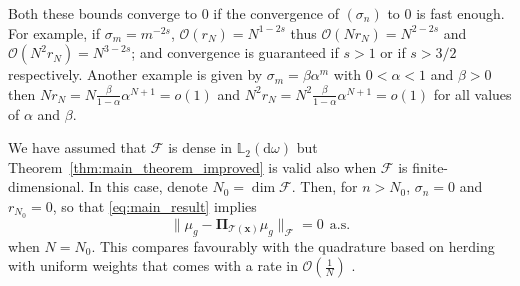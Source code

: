 \documentclass[twoside,11pt]{book}
\numberwithin{theorem}{chapter}
\numberwithin{definition}{chapter}
\numberwithin{proposition}{chapter}
\numberwithin{corollary}{chapter}
\numberwithin{example}{chapter}
\numberwithin{lemma}{chapter}
\begin{document}
Both these bounds converge to $0$ if the convergence of $(\sigma_{n})$ to $0$ is fast enough. For example, if $\sigma_{m} = m^{-2s}$, $\mathcal{O}(r_{N}) = N^{1-2s}$ thus $\mathcal{O}(Nr_{N}) = N^{2-2s}$ and $\mathcal{O}(N^{2}r_{N}) = N^{3-2s}$; and convergence is guaranteed if $s >1$ or if $s>3/2$ respectively. Another example is given by $\sigma_{m} = \beta \alpha^{m}$ with $0 < \alpha < 1$ and $\beta >0$ then $Nr_{N} = N\frac{\beta}{1-\alpha}\alpha^{N+1}=  o(1)$ and $N^{2}r_{N} = N^{2}\frac{\beta}{1-\alpha}\alpha^{N+1}=  o(1)$ for all values of $\alpha$ and $\beta$.







We have assumed that $\mathcal{F}$ is dense in $\mathbb{L}_{2}(\mathrm{d}\omega)$ but Theorem~\ref{thm:main_theorem_improved} is valid also when $\mathcal{F}$ is finite-dimensional. In this case, denote $N_{0} = \dim \mathcal{F}$. Then, for $n > N_{0}$, $\sigma_{n} = 0$ and $r_{N_{0}} = 0$, so that \eqref{eq:main_result} implies
\begin{equation}
  \| \mu_{g} - \bm{\Pi}_{\mathcal{T}(\bm{x})}\mu_{g}\|_{\mathcal{F}}= 0 \:\: \text{a.s.}
\end{equation}
when $N= N_0$.
This compares favourably with the quadrature based on herding with uniform weights that comes with a rate in $\mathcal{O}(\frac{1}{N})$  \citep{ChWeSm10,BaLaOb12}. 


\end{document}
